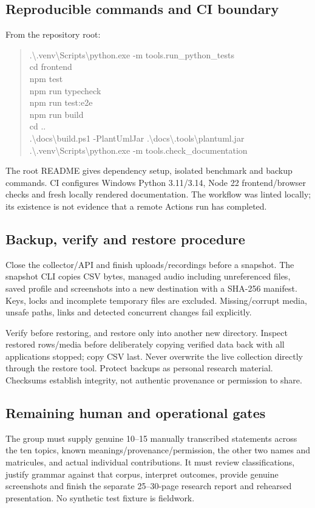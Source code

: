 \documentclass[11pt,a4paper]{article}
\begin{document}
\subsection{Reproducible commands and CI boundary}
From the repository root:
\begin{quote}\ttfamily\small
.\textbackslash.venv\textbackslash Scripts\textbackslash python.exe -m tools.run\_python\_tests\\
cd frontend\\
npm test\\
npm run typecheck\\
npm run test:e2e\\
npm run build\\
cd ..\\
.\textbackslash docs\textbackslash build.ps1 -PlantUmlJar .\textbackslash docs\textbackslash.tools\textbackslash plantuml.jar\\
.\textbackslash.venv\textbackslash Scripts\textbackslash python.exe -m tools.check\_documentation
\end{quote}
The root README gives dependency setup, isolated benchmark and backup commands.
CI configures Windows Python 3.11/3.14, Node 22 frontend/browser checks and
fresh locally rendered documentation. The workflow was linted locally; its
existence is not evidence that a remote Actions run has completed.

\subsection{Backup, verify and restore procedure}
Close the collector/API and finish uploads/recordings before a snapshot.
The snapshot CLI copies CSV bytes, managed audio including unreferenced files,
saved profile and screenshots into a new destination with a SHA-256 manifest.
Keys, locks and incomplete temporary files are excluded. Missing/corrupt media,
unsafe paths, links and detected concurrent changes fail explicitly.

Verify before restoring, and restore only into another new directory.
Inspect restored rows/media before deliberately copying verified data back
with all applications stopped; copy CSV last. Never overwrite the live
collection directly through the restore tool. Protect backups as personal
research material. Checksums establish integrity, not authentic provenance
or permission to share.

\subsection{Remaining human and operational gates}
The group must supply genuine 10--15 manually transcribed statements across
the ten topics, known meanings/provenance/permission, the other two names and
matricules, and actual individual contributions. It must review classifications,
justify grammar against that corpus, interpret outcomes, provide genuine
screenshots and finish the separate 25--30-page research report and rehearsed
presentation. No synthetic test fixture is fieldwork.
\end{document}
